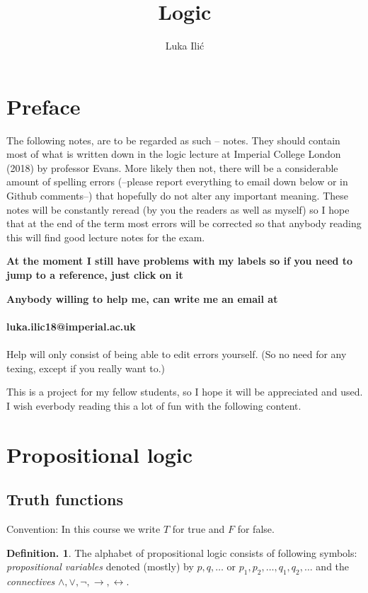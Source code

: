 \documentclass[a4paper,oneside,11pt,DIV=12,parskip=half]{scrartcl}
\title{Logic}
\author{ Luka Ili\'{c}}
\theoremstyle{plain}
\theoremstyle{definition}
\newtheorem{definition}[theorem]{Definition.}
\newtheorem{remark, definition}[theorem]{Remark and Definition.}
\newtheorem{lemma, definition}[theorem]{Lemma and Definition.}
\newtheorem{theorem, definition}[theorem]{Theorem and Definition.}
\theoremstyle{remark}
\newtheorem*{remark, example}{\textbf{Remark and Exercise}}
\begin{document}
\maketitle

\pagebreak

\tableofcontents

\pagebreak

\section*{Preface}
The following notes, are to be regarded as such -- notes. They should contain most of what is written down in the logic lecture at Imperial College London (2018) by professor Evans. More likely then not, there will be a considerable amount of spelling errors (--please report everything to email down below or in Github comments--) that hopefully do not alter any important meaning. These notes will be constantly reread (by you the readers as well as myself) so I hope that at the end of the term most errors will be corrected so that anybody reading this will find good lecture notes for the exam.

\textbf{At the moment I still have problems with my labels so if you need to jump to a reference, just click on it}

\textbf{Anybody willing to help me, can write me an email at \\
\\ luka.ilic18@imperial.ac.uk} \\ \\ Help will only consist of being able to edit errors yourself. (So no need for any texing, except if you really want to.)

This is a project for my fellow students, so I hope it will be appreciated and used. I wish everbody reading this a lot of fun with the following content.

\pagebreak

\section{Propositional logic}

\subsection{Truth functions}
Convention: In this course we write $T$ for true and $F$ for false.

\begin{definition}
	The alphabet of propositional logic consists of following symbols:
 \emph{propositional variables} denoted (mostly) by $ p,q, \dots $ or 	$p_1,p_2,\dots, q_1, q_2, \dots$
	and the \emph{connectives} $\land, \lor, \lnot, \rightarrow, \leftrightarrow$.
\end{definition}
\end{document}
